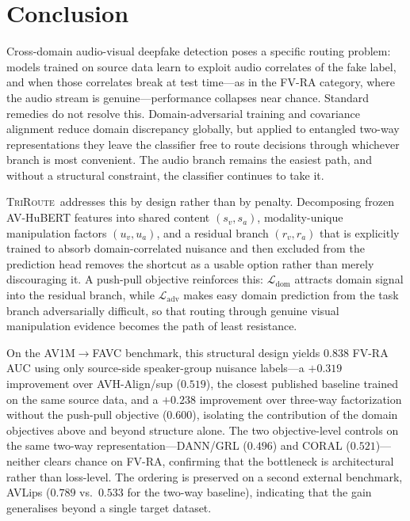 \documentclass{article}
\newcommand{\method}{\textsc{TriRoute}}
\begin{document}
\section{Conclusion}

Cross-domain audio-visual deepfake detection poses a specific routing problem: models trained on source data learn to exploit audio correlates of the fake label, and when those correlates break at test time---as in the FV-RA category, where the audio stream is genuine---performance collapses near chance. Standard remedies do not resolve this. Domain-adversarial training and covariance alignment reduce domain discrepancy globally, but applied to entangled two-way representations they leave the classifier free to route decisions through whichever branch is most convenient. The audio branch remains the easiest path, and without a structural constraint, the classifier continues to take it.

\method\ addresses this by design rather than by penalty. Decomposing frozen AV-HuBERT features into shared content $(s_v, s_a)$, modality-unique manipulation factors $(u_v, u_a)$, and a residual branch $(r_v, r_a)$ that is explicitly trained to absorb domain-correlated nuisance and then excluded from the prediction head removes the shortcut as a usable option rather than merely discouraging it. A push-pull objective reinforces this: $\mathcal{L}_{\mathrm{dom}}$ attracts domain signal into the residual branch, while $\mathcal{L}_{\mathrm{adv}}$ makes easy domain prediction from the task branch adversarially difficult, so that routing through genuine visual manipulation evidence becomes the path of least resistance.

On the AV1M$\rightarrow$FAVC benchmark, this structural design yields $0.838$ FV-RA AUC using only source-side speaker-group nuisance labels---a $+0.319$ improvement over AVH-Align/sup ($0.519$), the closest published baseline trained on the same source data, and a $+0.238$ improvement over three-way factorization without the push-pull objective ($0.600$), isolating the contribution of the domain objectives above and beyond structure alone. The two objective-level controls on the same two-way representation---DANN/GRL ($0.496$) and CORAL ($0.521$)---neither clears chance on FV-RA, confirming that the bottleneck is architectural rather than loss-level. The ordering is preserved on a second external benchmark, AVLips ($0.789$ vs.\ $0.533$ for the two-way baseline), indicating that the gain generalises beyond a single target dataset.
\end{document}
